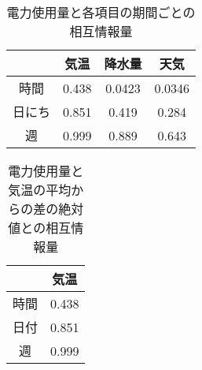 \begin{itemize}
\begin{table}[t]
\centering
  \caption{電力使用量と各項目の期間ごとの相互情報量}
  \label{tab:soukankeisuu}
  \begin{tabular}{|c||c|c|c|} \hline
     &  気温 & 降水量 & 天気 \\ \hline
    時間 & 0.438 & 0.0423 & 0.0346 \\ \hline
    日にち & 0.851 & 0.419 & 0.284 \\ \hline
    週 & 0.999 & 0.889 & 0.643 \\ \hline
  \end{tabular}
\end{table}
\begin{table}[t]
\centering
  \caption{電力使用量と気温の平均からの差の絶対値との相互情報量}
  \vspace{3mm}
  \begin{tabular}{|c||c|} \hline
     &  気温 \\ \hline \hline
    時間 & 0.438 \\ \hline
    日付 & 0.851 \\ \hline
    週 & 0.999 \\ \hline
  \end{tabular}
\end{table}
\end{itemize}

